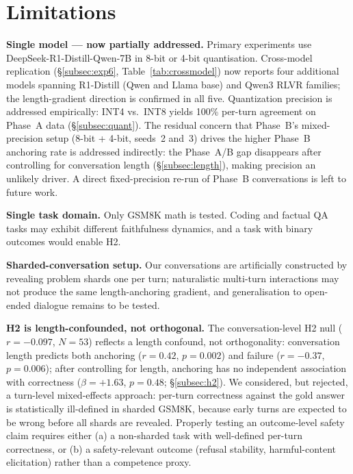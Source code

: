 \documentclass{article}
\begin{document}
\section{Limitations}
\label{sec:limits}

\textbf{Single model --- now partially addressed.}
Primary experiments use DeepSeek-R1-Distill-Qwen-7B in 8-bit or
4-bit quantisation.
Cross-model replication (\S\ref{subsec:exp6}, Table~\ref{tab:crossmodel})
now reports four additional models spanning R1-Distill (Qwen and
Llama base) and Qwen3 RLVR families; the length-gradient direction
is confirmed in all five.
Quantization precision is addressed empirically: INT4 vs.\ INT8
yields 100\% per-turn agreement on Phase~A data (\S\ref{subsec:quant}).
The residual concern that Phase~B's mixed-precision setup (8-bit +
4-bit, seeds~2 and~3) drives the higher Phase~B anchoring rate is
addressed indirectly: the Phase~A/B gap disappears after controlling
for conversation length (\S\ref{subsec:length}), making precision an
unlikely driver. A direct fixed-precision re-run of Phase~B
conversations is left to future work.

\textbf{Single task domain.}
Only GSM8K math is tested.
Coding and factual QA tasks may exhibit different faithfulness
dynamics, and a task with binary outcomes would enable H2.

\textbf{Sharded-conversation setup.}
Our conversations are artificially constructed by revealing problem
shards one per turn; naturalistic multi-turn interactions may not
produce the same length-anchoring gradient, and generalisation to
open-ended dialogue remains to be tested.

\textbf{H2 is length-confounded, not orthogonal.}
The conversation-level H2 null ($r = -0.097$, $N=53$) reflects a
length confound, not orthogonality: conversation length predicts both
anchoring ($r=0.42$, $p=0.002$) and failure ($r=-0.37$, $p=0.006$);
after controlling for length, anchoring has no independent association
with correctness ($\beta=+1.63$, $p=0.48$; \S\ref{subsec:h2}).
We considered, but rejected, a turn-level mixed-effects approach:
per-turn correctness against the gold answer is statistically ill-defined
in sharded GSM8K, because early turns are expected to be wrong before all
shards are revealed.
Properly testing an outcome-level safety claim requires either
(a) a non-sharded task with well-defined per-turn correctness, or
(b) a safety-relevant outcome (refusal stability, harmful-content
elicitation) rather than a competence proxy.
\end{document}
